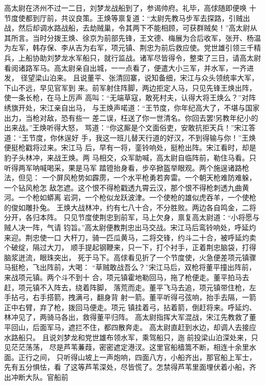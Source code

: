 高太尉在济州不过一二日，刘梦龙战船到了，参谒帅府。礼毕，高俅随即便唤
十节度使都到厅前，共议良策。王焕等禀复道：“太尉先教马步军去探路，引贼出
战，然后却调水路战船，去劫贼巢，令其两下不能相顾，可获群贼矣！”高太尉从
其所言。当时分拨王焕、徐京为前部先锋，王文德、梅展为合后收军，张开、杨温
为左军，韩存保、李从吉为右军，项元镇、荆忠为前后救应使。党世雄引领三千精
兵，上船协助刘梦龙水军船只，就行监战。诸军尽皆得令，整束了三日，请高太尉
看阅诸路军马。高太尉亲自出城，一一点看了，便遣大小三军，并水军，一齐进发，
径望梁山泊来。
且说董平、张清回寨，说知备细，宋江与众头领统率大军，下山不远，早见官军到
来。前军射住阵脚，两边拒定人马，只见先锋王焕出阵，使一条长枪，在马上厉声
高叫：“无端草寇，敢死村夫，认得大将王焕么？”对阵绣旗开处，宋江亲自出马，
与王焕声喏道：“王节度，你年纪高大了，不堪与国家出力，当枪对敌，恐有些一
差二误，枉送了你一世清名。你回去罢!另教年纪小的出来战。”王焕听得大怒，
骂道：“你这厮是个文面俗吏，安敢抗拒天兵！”宋江答道：“王节度，你休逞好
手，我这一班儿替天行道的好汉，不到得输与你！”王焕便挺枪戳将过来。宋江马
后，早有一将，銮铃响处，挺枪出阵。宋江看时，却是豹子头林冲，来战王焕。两
马相交，众军助喊，高太尉自临阵前，勒住马看。只听得两军呐喊喝采，果是马军
踏镫抬身看，步卒掀盔举眼观。两个施逞诸路枪法，但见：
一个屏风枪势如霹雳，一个水平枪勇若奔雷。一个朝天枪难防难躲，一个钻风枪怎
敌怎遮。这个恨不得枪戳透九霄云汉，那个恨不得枪刺透九曲黄河。一个枪如蟒离
岩洞，一个枪似龙跃波津。一个使枪的雄似虎吞羊，一个使枪的俊如雕扑兔。
王焕大战林冲，约有七八十合，不分胜败。两边各自鸣金，二将分开，各归本阵。
只见节度使荆忠到前军，马上欠身，禀复高太尉道：“小将愿与贼人决一阵，气请
钧旨。”高太尉便教荆忠出马交战。宋江马后鸾铃响处，呼延灼来迎。荆忠使一口
大杆刀，骑一匹瓜黄马，二将交锋，约斗二十合，被呼延灼卖个破绽，隔过大刀，
顺手提起钢鞭来，只一下，打个衬手，正着荆忠脑袋，打得脑浆迸流，眼珠突出，
死于马下。高俅看见折了一个节度使，火急便差项元镇骤马挺枪，飞出阵前，大喝：
“草贼敢战吾么？”宋江马后，双枪将董平撞出阵前，来战项元镇。两个斗不到十
合，项元镇霍地勒回马，拖了枪便走。董平拍马去赶，项元镇不入阵去，绕着阵脚，
落荒而走。董平飞马去追，项元镇带住枪，左手拈弓，右手搭箭，拽满弓，翻身背
射一箭。董平听得弓弦响，抬手去隔，一箭正中右臂，弃了枪，拨回马便走。项元
镇挂着弓，拈着箭，倒赶将来。呼延灼、林冲见了，两骑马各出，救得董平归阵。
高太尉指挥大军混战，宋江先教救了董平回山，后面军马，遮拦不住，都四散奔走。
高太尉直赶到水边，却调人去接应水路船只。
且说刘梦龙和党世雄布领水军，乘驾船只，迤前投梁山泊深处来，只见茫茫荡荡，
尽是芦苇蒹葭，密密遮定港汊。这里官船樯篙不断，相连十余里水面。正行之间，
只听得山坡上一声炮响，四面八方，小船齐出，那官船上军士，先有五分惧怯，看
了这等芦苇深处，尽皆慌了。怎禁得芦苇里面埋伏着小船，齐出冲断大队。官船前
